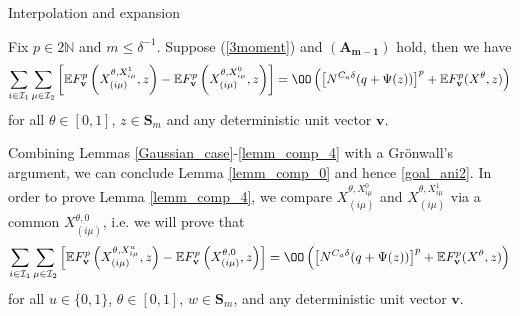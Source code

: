\begin{subsection}{Interpolation and expansion}
\begin{lemma}\label{lemm_comp_4}
 Fix $p\in 2\mathbb N$ and $m\le \delta^{-1}$. Suppose (\ref{3moment}) and $\mathbf{(A_{m-1})}$ hold, then we have
 \begin{equation}
  \sum_{i\in\mathcal I_1}\sum_{\mu\in\mathcal I_2}\left[\mathbb EF_{\mathbf v}^p\left(X^{\theta,X_{i\mu}^1}_{(i\mu)},z\right)-\mathbb EF_{\mathbf v}^p\left(X^{\theta,X_{i\mu}^0}_{(i\mu)},z\right)\right]=
  \OO\left(\left[N^{C_a\delta} (q+\Psi(z))\right]^p+\mathbb EF_{\mathbf v}^p(X^\theta,z)\right)
 \end{equation}
 for all $\theta\in[0,1]$, $z\in\mathbf S_m$ and any deterministic unit vector $\mathbf v$.
\end{lemma}
Combining Lemmas \ref{Gaussian_case}-\ref{lemm_comp_4} with a Gr\"onwall's argument, we can conclude Lemma \ref{lemm_comp_0} and hence \eqref{goal_ani2}. %
In order to prove Lemma \ref{lemm_comp_4}, we compare $X^{\theta,X_{i\mu}^0}_{(i\mu)}$ and $X^{\theta,X_{i\mu}^1}_{(i\mu)}$ via a common $X^{\theta,0}_{(i\mu)}$, i.e. we will prove that
\begin{equation}\label{lemm_comp_5}
\sum_{i\in\mathcal I_1}\sum_{\mu\in\mathcal I_2}\left[\mathbb EF_{\mathbf v}^p\left(X^{\theta,X_{i\mu}^u}_{(i\mu)},z\right)-\mathbb EF_{\mathbf v}^p\left(X^{\theta,0}_{(i\mu)},z\right)\right]= \OO\left(\left[N^{C_a\delta} (q+\Psi(z))\right]^p+\mathbb EF_{\mathbf v}^p(X^\theta,z)\right)
 \end{equation}
for all $u\in \{0,1\}$, $\theta\in[0,1]$, $w\in \mathbf{S}_m$, and any deterministic unit vector $\mathbf v$.


\end{subsection}
